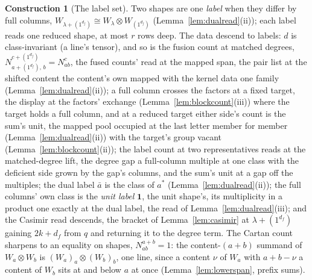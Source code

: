 \documentclass[11pt]{article}
\theoremstyle{definition}
\newtheorem{construction}{Construction}
\begin{document}
\begin{construction}[The label set]\label{con:labels}
Two shapes are one \emph{label} when they differ by full columns,
$W_{\lambda+(1^{d_f})}\cong W_\lambda\otimes W_{(1^{d_f})}$
(Lemma~\ref{lem:dualread}(ii)); each label reads one reduced shape, at
most $r$ rows deep. The data descend to labels: $d$ is
class-invariant (a line's tensor), and so is the fusion count at matched
degrees, $N^{c+(1^{d_f})}_{a+(1^{d_f}),\,b}=N^c_{ab}$, the fused
counts' read at the mapped span, the pair list at the shifted
content the content's own mapped with the kernel data one family
(Lemma~\ref{lem:dualread}(ii)); a full column crosses the factors
at a fixed target, the display at the factors' exchange
(Lemma~\ref{lem:blockcount}(iii)) where the target holds a full
column, and at a reduced target either side's count is the sum's
unit, the mapped pool occupied at the last letter member for
member (Lemma~\ref{lem:dualread}(ii)) with the target's group
vacant (Lemma~\ref{lem:blockcount}(ii)); the label count at two
representatives reads at the matched-degree lift, the degree gap a
full-column multiple at one class with the deficient side grown by
the gap's columns, and the sum's unit at a gap off the multiples;
the dual label $\bar a$ is the
class of $a^*$ (Lemma~\ref{lem:dualread}(ii)); the full columns'
own class is the \emph{unit label} $\mathbf 1$, the unit shape's,
its multiplicity in a product one exactly at the dual label, the
read of Lemma~\ref{lem:dualread}(iii); and the
Casimir read descends, the bracket of Lemma~\ref{lem:casimir} at
$\lambda+(1^{d_f})$ gaining $2k+d_f$ from $q$ and returning it to the degree
term. The Cartan count sharpens to an equality on shapes,
$N^{a+b}_{ab}=1$: the content-$(a{+}b)$ summand of $W_a\otimes W_b$ is
$(W_a)_a\otimes(W_b)_b$, one line, since a content $\nu$ of $W_a$ with
$a+b-\nu$ a content of $W_b$ sits at and below $a$ at once
(Lemma~\ref{lem:lowerspan}, prefix sums).
\end{construction}
\end{document}
